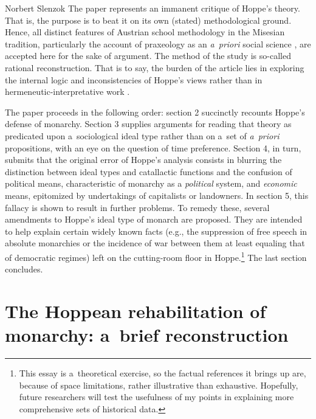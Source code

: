 \begin{artengenv}{Norbert Slenzok}
The paper represents an immanent critique of Hoppe's theory. That is, the purpose is to beat it on its own (stated) methodological ground. Hence, all distinct features of Austrian school methodology in the Misesian tradition, particularly the account of praxeology as an \textit{a~priori} social science 
\parencites[see][]{mises_ultimate_1962}[][]{mises_human_1998}[][]{mises_theory_2007}, %
 are accepted here for the sake of argument. The method of the study is so-called rational reconstruction. That is to say, the burden of the article lies in exploring the internal logic and inconsistencies of Hoppe's views rather than in hermeneutic-interpretative work 
\parencite[][]{linsbichler_was_2017}.%




The paper proceeds in the following order: section 2 succinctly recounts Hoppe's defense of monarchy. Section 3 supplies arguments for reading that theory as predicated upon a~sociological ideal type rather than on a~set of \textit{a~priori} propositions, with an eye on the question of time preference. Section 4, in turn, submits that the original error of Hoppe's analysis consists in blurring the distinction between ideal types and catallactic functions and the confusion of political means, characteristic of monarchy as a \textit{political} system, and \textit{economic} means, epitomized by undertakings of capitalists or landowners. In section 5, this fallacy is shown to result in further problems. To remedy these, several amendments to Hoppe's ideal type of monarch are proposed. They are intended to help explain certain widely known facts (e.g., the suppression of free speech in absolute monarchies or the incidence of war between them at least equaling that of democratic regimes) left on the cutting-room floor in Hoppe.\footnote{This essay is a~theoretical exercise, so the factual references it brings up are, because of space limitations, rather illustrative than exhaustive. Hopefully, future researchers will test the usefulness of my points in explaining more comprehensive sets of historical data. } The last section concludes.



\section{The Hoppean rehabilitation of monarchy: a~brief reconstruction}


\end{artengenv}
